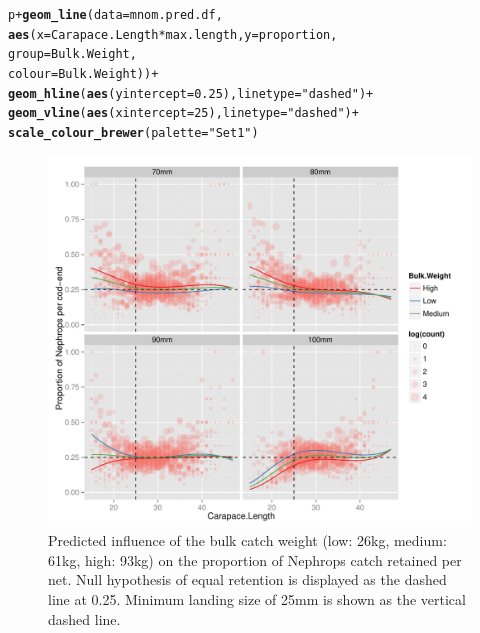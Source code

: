 \documentclass[12pt]{article}\usepackage[]{graphicx}\usepackage[]{color}
\makeatletter
\def\maxwidth{ %
  \ifdim\Gin@nat@width>\linewidth
    \linewidth
  \else
    \Gin@nat@width
  \fi
}
\newcommand{\hlnum}[1]{\textcolor[rgb]{0.686,0.059,0.569}{#1}}%
\newcommand{\hlstr}[1]{\textcolor[rgb]{0.192,0.494,0.8}{#1}}%
\newcommand{\hlopt}[1]{\textcolor[rgb]{0,0,0}{#1}}%
\newcommand{\hlstd}[1]{\textcolor[rgb]{0.345,0.345,0.345}{#1}}%
\newcommand{\hlkwc}[1]{\textcolor[rgb]{0.333,0.667,0.333}{#1}}%
\newcommand{\hlkwd}[1]{\textcolor[rgb]{0.737,0.353,0.396}{\textbf{#1}}}%
\newenvironment{kframe}{%
 \def\at@end@of@kframe{}%
 \ifinner\ifhmode%
  \def\at@end@of@kframe{\end{minipage}}%
  \begin{minipage}{\columnwidth}%
 \fi\fi%
 \def\FrameCommand##1{\hskip\@totalleftmargin \hskip-\fboxsep
 \colorbox{shadecolor}{##1}\hskip-\fboxsep
     \hskip-\linewidth \hskip-\@totalleftmargin \hskip\columnwidth}%
 \MakeFramed {\advance\hsize-\width
   \@totalleftmargin\z@ \linewidth\hsize
   \@setminipage}}%
 {\par\unskip\endMakeFramed%
 \at@end@of@kframe}
\newenvironment{knitrout}{}{} %
\makeatother
\begin{document}
\begin{knitrout}
\begin{kframe}
\begin{alltt}
\hlstd{p} \hlopt{+} \hlkwd{geom_line}\hlstd{(}\hlkwc{data} \hlstd{= mnom.pred.df,}
              \hlkwd{aes}\hlstd{(}\hlkwc{x} \hlstd{= Carapace.Length}\hlopt{*}\hlstd{max.length,} \hlkwc{y} \hlstd{= proportion,}
                  \hlkwc{group} \hlstd{= Bulk.Weight,}
                  \hlkwc{colour} \hlstd{= Bulk.Weight))} \hlopt{+}
  \hlkwd{geom_hline}\hlstd{(}\hlkwd{aes}\hlstd{(}\hlkwc{yintercept} \hlstd{=} \hlnum{0.25}\hlstd{),} \hlkwc{linetype} \hlstd{=} \hlstr{"dashed"}\hlstd{)} \hlopt{+}
  \hlkwd{geom_vline}\hlstd{(}\hlkwd{aes}\hlstd{(}\hlkwc{xintercept} \hlstd{=} \hlnum{25}\hlstd{),} \hlkwc{linetype} \hlstd{=} \hlstr{"dashed"}\hlstd{)} \hlopt{+}
  \hlkwd{scale_colour_brewer}\hlstd{(}\hlkwc{palette}\hlstd{=}\hlstr{"Set1"}\hlstd{)}
\end{alltt}
\end{kframe}\begin{figure}
\includegraphics[width=\maxwidth]{figure/unnamed-chunk-10-1} \caption[Predicted influence of the bulk catch weight (low]{Predicted influence of the bulk catch weight (low: 26kg, medium: 61kg, high: 93kg) on the proportion of Nephrops catch retained per net. Null hypothesis of equal retention is displayed as the dashed line at 0.25. Minimum landing size of 25mm is shown as the vertical dashed line.}\label{fig:unnamed-chunk-10}
\end{figure}


\end{knitrout}



\end{document}
